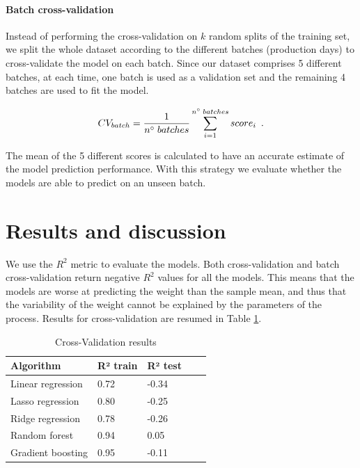 \paragraph{Batch cross-validation}

Instead of performing the cross-validation on $k$ random splits of the training set, we split the whole dataset according to the different batches (production days) to cross-validate the model on each batch. Since our dataset comprises 5 different batches, at each time, one batch is used as a validation set and the remaining 4 batches are used to fit the model.

\begin{equation}
    CV_{batch} = \frac{1}{n\degree\;batches}\sum_{i=1}^{n\degree\;batches}score_{i}
    \enspace.
\end{equation}

The mean of the 5 different scores is calculated to have an accurate estimate of the model prediction performance. With this strategy we evaluate whether the models are able to predict on an unseen batch.  


\section{Results and discussion} \label{Results and Discussions}

We use the $R^2$ metric to evaluate the models. Both cross-validation and batch cross-validation return negative $R^2$ values for all the models. 
This means that the models are worse at predicting the weight than the sample mean, and thus that the variability of the weight cannot be explained by the parameters of the process. Results for cross-validation are resumed in Table \ref{tab:cross_validation_results}.  

\begin{table}[]
\centering
\caption{Cross-Validation results}
\label{tab:cross_validation_results}
\begin{tabular}{lllll}
\toprule
\textbf{Algorithm} & \textbf{R² train} & \textbf{R² test} \\
\midrule
Linear regression   & 0.72   & -0.34    \\ 
Lasso regression    & 0.80   & -0.25    \\ 
Ridge regression    & 0.78   & -0.26    \\ 
Random forest       & 0.94   & 0.05     \\ 
Gradient boosting   & 0.95   & -0.11    \\ 
\bottomrule
\end{tabular}
\end{table}


